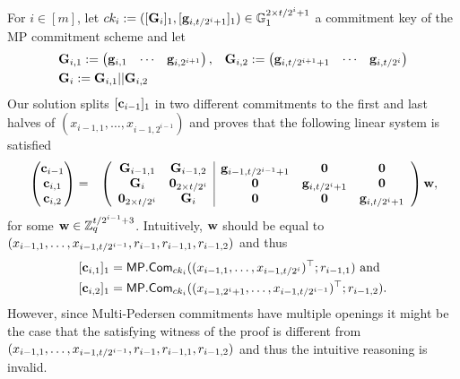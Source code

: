 For \(i\in[m]\), let \(ck_i:=([\mathbf{{G}}_i]_1,\allowbreak[\mathbf{g}_{i,t /2^i+1}]_1)\in\mathbb{G}_1^{2\times{t/2^i+1}}\) a commitment key of the MP commitment scheme and let
\begin{align*}
&\mathbf{{G}}_{i,1}:=
\begin{pmatrix}
    \mathbf{g}_{i,1}&\cdots&\mathbf{g}_{i,2^{i+1}}
\end{pmatrix},
&\mathbf{{G}}_{i,2}:=
\begin{pmatrix}
    \mathbf{g}_{i,t /2^{i+1}+1}&\cdots&\mathbf{g}_{i,t /2^i}
\end{pmatrix}\\
&\mathbf{{G}}_i:=\mathbf{{G}}_{i,1}||\mathbf{{G}}_{i,2}
\end{align*}
Our solution splits \([\mathbf{c}_{i-1}]_1\) in two different commitments to the first and last halves of \((x_{i-1,1},\ldots,x_{i-1,2^{i-1}})\) and proves that the following linear system is satisfied
{\begin{align}
&\begin{pmatrix}
\mathbf{c}_{i-1}\\
\mathbf{c}_{i,1}\\
\mathbf{c}_{i,2}
\end{pmatrix}
=
&\left(\begin{array}{cc|ccc}
\mathbf{{G}}_{i-1,1}         & \mathbf{{G}}_{i-1,2}         & \mathbf{g}_{i-1,t /2^{i-1}+1} & \mathbf{0}             & \mathbf{0}\\
\mathbf{{G}}_{i}             & \mathbf{{0}}_{2\times t /2^i} & \mathbf{0}                   & \mathbf{g}_{i,t /2^i+1} & \mathbf{0} \\
\mathbf{{0}}_{2\times t /2^i} & \mathbf{{G}}_{i}             & \mathbf{0}                   & \mathbf{0}             & \mathbf{g}_{i,t /2^i+1}
\end{array}\right)
\mathbf{w},\label{eq-log-split}
\end{align}}%
for some \(\mathbf{w}\in\mathbb{Z}_q^{t /2^{i-1}+3}\).
Intuitively, \(\mathbf{w}\) should be equal to \((x_{i-1,1},\ldots,x_{i-1,t /2^{i-1}},\allowbreak r_{i-1},r_{i-1,1},r_{i-1,2})\) and thus 
\begin{align*}
&[\mathbf{c}_{i,1}]_1=\mathsf{MP}.\mathsf{Com}_{ck_i}(\allowbreak(x_{i-1,1},\ldots,x_{i-1,t /2^{i}})^\top;r_{i-1,1})\text{ and }\\
&[\mathbf{c}_{i,2}]_1=\mathsf{MP}.\mathsf{Com}_{ck_i}((x_{i-1,2^i+1},\ldots, x_{i-1,t /2^{i-1}})^\top;r_{i-1,2}).
\end{align*}
However, since Multi-Pedersen commitments have multiple openings it might be the case that the satisfying witness of the proof is different from \((x_{i-1,1},\ldots,\allowbreak x_{i-1,t /2^{i-1}},r_{i-1},r_{i-1,1},r_{i-1,2})\) and thus the intuitive reasoning is invalid.

